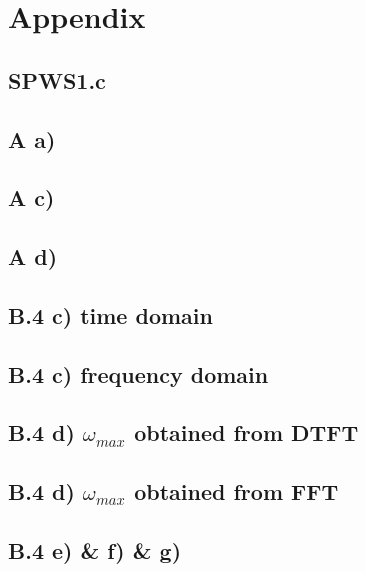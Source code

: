 \documentclass{article}
\newenvironment{homeworkProblem}[1]{
	\section*{#1}
	}{
}
\newenvironment{homeworkSection}[1]{
	\subsection*{#1}
	}{
}
\begin{document}
\newpage
\begin{homeworkProblem}{Appendix}

\begin{homeworkSection}{SPWS1.c}

\end{homeworkSection}

\newpage
\begin{homeworkSection}{A a)}

\end{homeworkSection}

\begin{homeworkSection}{A c)}

\end{homeworkSection}

\begin{homeworkSection}{A d)}

\end{homeworkSection}

\newpage
\begin{homeworkSection}{B.4 c) time domain}

\end{homeworkSection}

\begin{homeworkSection}{B.4 c) frequency domain}

\end{homeworkSection}

\begin{homeworkSection}{B.4 d) $\omega_{max}$ obtained from DTFT}

\end{homeworkSection}

\begin{homeworkSection}{B.4 d) $\omega_{max}$ obtained from FFT}

\end{homeworkSection}

\begin{homeworkSection}{B.4 e) \& f) \& g)}

\end{homeworkSection}

\end{homeworkProblem}

\end{document}
